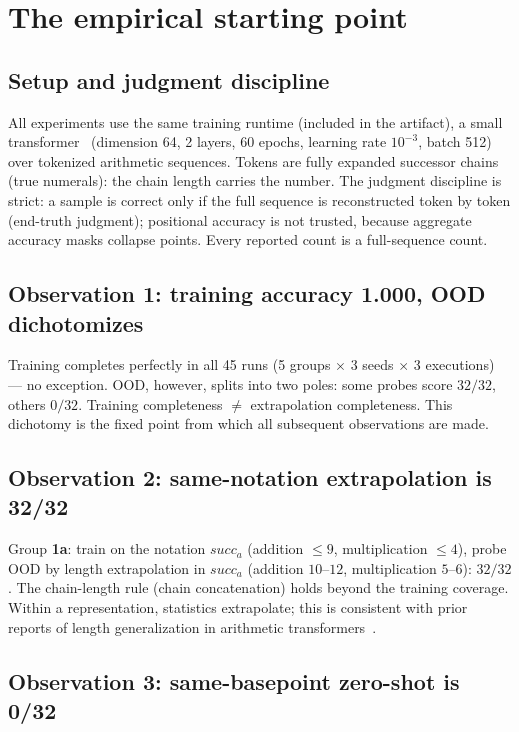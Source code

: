 \documentclass[sigplan,10pt,anonymous,review]{acmart}
\begin{document}
\section{The empirical starting point}

\subsection{Setup and judgment discipline}

All experiments use the same training runtime (included in the
artifact), a small transformer~\cite{vaswani2017attention}
(dimension 64, 2 layers, 60 epochs,
learning rate $10^{-3}$, batch 512) over tokenized arithmetic
sequences. Tokens are fully expanded successor chains (true numerals):
the chain length carries the number. The judgment discipline is strict:
a sample is correct only if the full sequence is reconstructed token by
token (end-truth judgment); positional accuracy is not trusted, because
aggregate accuracy masks collapse points. Every reported count is a
full-sequence count.

\subsection{Observation 1: training accuracy 1.000, OOD dichotomizes}

Training completes perfectly in all 45 runs (5 groups $\times$ 3 seeds
$\times$ 3 executions) --- no exception. OOD, however, splits into two
poles: some probes score $32/32$, others $0/32$. Training completeness
$\neq$ extrapolation completeness. This dichotomy is the fixed point
from which all subsequent observations are made.

\subsection{Observation 2: same-notation extrapolation is 32/32}

Group \textbf{1a}: train on the notation $\mathit{succ}_a$ (addition
$\le 9$, multiplication $\le 4$), probe OOD by length extrapolation in
$\mathit{succ}_a$ (addition $10$--$12$, multiplication $5$--$6$):
$32/32$. The chain-length rule (chain concatenation) holds beyond the
training coverage. Within a representation, statistics extrapolate;
this is consistent with prior reports of length generalization in
arithmetic transformers~\cite{duan2023interpolation,
madsen2020arithmetic}.

\subsection{Observation 3: same-basepoint zero-shot is 0/32}
\end{document}
